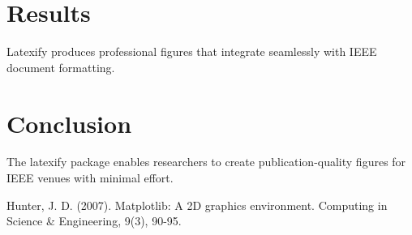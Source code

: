 \documentclass[10pt,twocolumn]{article}
\begin{document}
\section{Results}

Latexify produces professional figures that integrate seamlessly with IEEE document formatting.

\section{Conclusion}

The latexify package enables researchers to create publication-quality figures for IEEE venues with minimal effort.

\begin{thebibliography}{9}
 Hunter, J. D. (2007). Matplotlib: A 2D graphics environment. Computing in Science \& Engineering, 9(3), 90-95.
\end{thebibliography}
\end{document}
